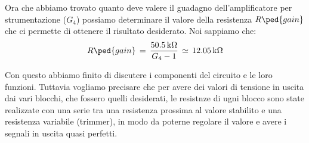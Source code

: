 Ora che abbiamo trovato quanto deve valere il guadagno dell'amplificatore per strumentazione ($G_4$) possiamo determinare il valore della resistenza $R\ped{gain}$ che ci permette di ottenere il risultato desiderato. Noi sappiamo che:
\begin{equation}
	R\ped{gain}\,=\,\frac{\SI{50.5}{\kilo\ohm}}{G_4 - 1}\,\simeq\,\SI{12.05}{\kilo\ohm}
	\label{eq:Rgain}
\end{equation}


Con questo abbiamo finito di discutere i componenti del circuito e le loro funzioni. Tuttavia vogliamo precisare che per avere dei valori di tensione in uscita dai vari blocchi, che fossero quelli desiderati, le resistnze di ugni blocco sono state realizzate con una serie tra una resistenza prossima al valore stabilito e una resistenza variabile (trimmer), in modo da poterne regolare il valore e avere i segnali in uscita quasi perfetti.












